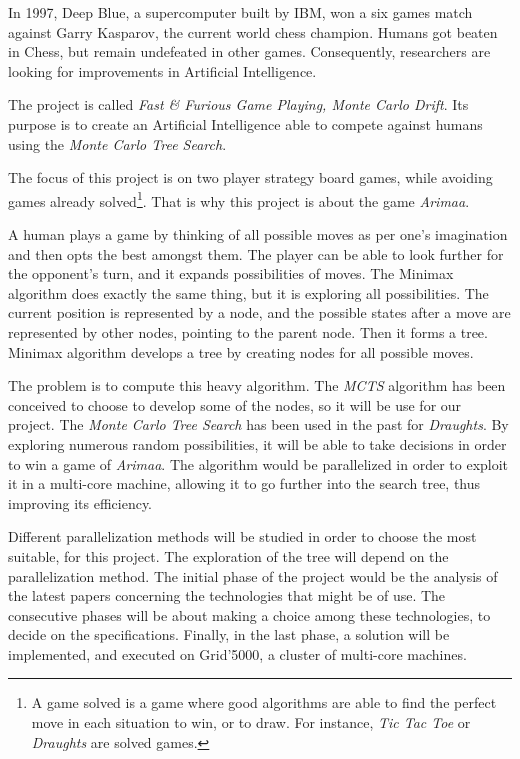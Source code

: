 
In 1997, Deep Blue, a supercomputer built by IBM, won a six games match against Garry Kasparov, the current world chess champion. Humans got beaten in Chess, but remain undefeated in other games. Consequently, researchers are looking for improvements in Artificial Intelligence.
\newline

The project is called \emph{Fast \& Furious Game Playing, Monte Carlo Drift}. Its purpose is to create an Artificial Intelligence able to compete against humans using the \emph{Monte Carlo Tree Search}.
\newline

The focus of this project is on two player strategy board games, while avoiding games already solved\footnote{A game solved is a game where good algorithms are able to find the perfect move in each situation to win, or to draw. For instance, \textit{Tic Tac Toe} or \textit{Draughts} are solved games.}. That is why this project is about the game \emph{Arimaa}.
\newline

A human plays a game by thinking of all possible moves as per one's imagination and then opts the best amongst them. The player can be able to look further for the opponent's turn, and it expands possibilities of moves. The Minimax algorithm does exactly the same thing, but it is exploring all possibilities. The current position is represented by a node, and the possible states after a move are represented by other nodes, pointing to the parent node. Then it forms a tree.
Minimax algorithm develops a tree by creating nodes for all possible moves.
\newline

The problem is to compute this heavy algorithm. The \emph{MCTS} algorithm has been conceived to choose to develop some of the nodes, so it will be use for our project.
The \emph{Monte Carlo Tree Search} has been used in the past for \textit{Draughts}. By exploring numerous random possibilities, it will be able to take decisions in order to win a game of \emph{Arimaa}.
The algorithm would be parallelized in order to exploit it in a multi-core machine, allowing it to go further into the search tree, thus improving its efficiency.
\newline

Different parallelization methods will be studied in order to choose the most suitable, for this project.
The exploration of the tree will depend on the parallelization method.
The initial phase of the project would be the analysis of the latest papers concerning the technologies that might be of use.
The consecutive phases will be about making a choice among these technologies, to decide on the specifications.
Finally, in the last phase, a solution will be implemented, and executed on Grid'5000, a cluster of multi-core machines.
\newline


